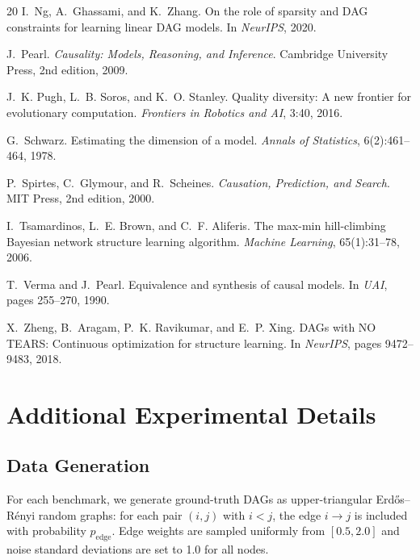 \documentclass[11pt,a4paper]{article}
\begin{document}
\begin{thebibliography}{20}
I.~Ng, A.~Ghassami, and K.~Zhang.
\newblock On the role of sparsity and DAG constraints for learning linear DAG models.
\newblock In \emph{NeurIPS}, 2020.

J.~Pearl.
\newblock \emph{Causality: Models, Reasoning, and Inference}.
\newblock Cambridge University Press, 2nd edition, 2009.

J.~K. Pugh, L.~B. Soros, and K.~O. Stanley.
\newblock Quality diversity: A new frontier for evolutionary computation.
\newblock \emph{Frontiers in Robotics and AI}, 3:40, 2016.

G.~Schwarz.
\newblock Estimating the dimension of a model.
\newblock \emph{Annals of Statistics}, 6(2):461--464, 1978.

P.~Spirtes, C.~Glymour, and R.~Scheines.
\newblock \emph{Causation, Prediction, and Search}.
\newblock MIT Press, 2nd edition, 2000.

I.~Tsamardinos, L.~E. Brown, and C.~F. Aliferis.
\newblock The max-min hill-climbing Bayesian network structure learning algorithm.
\newblock \emph{Machine Learning}, 65(1):31--78, 2006.

T.~Verma and J.~Pearl.
\newblock Equivalence and synthesis of causal models.
\newblock In \emph{UAI}, pages 255--270, 1990.

X.~Zheng, B.~Aragam, P.~K. Ravikumar, and E.~P. Xing.
\newblock DAGs with NO TEARS: Continuous optimization for structure learning.
\newblock In \emph{NeurIPS}, pages 9472--9483, 2018.

\end{thebibliography}

\appendix

\section{Additional Experimental Details}
\label{app:details}

\subsection{Data Generation}

For each benchmark, we generate ground-truth DAGs as upper-triangular Erd\H{o}s--R\'enyi random graphs: for each pair $(i, j)$ with $i < j$, the edge $i \to j$ is included with probability $p_{\text{edge}}$. Edge weights are sampled uniformly from $[0.5, 2.0]$ and noise standard deviations are set to 1.0 for all nodes.
\end{document}
